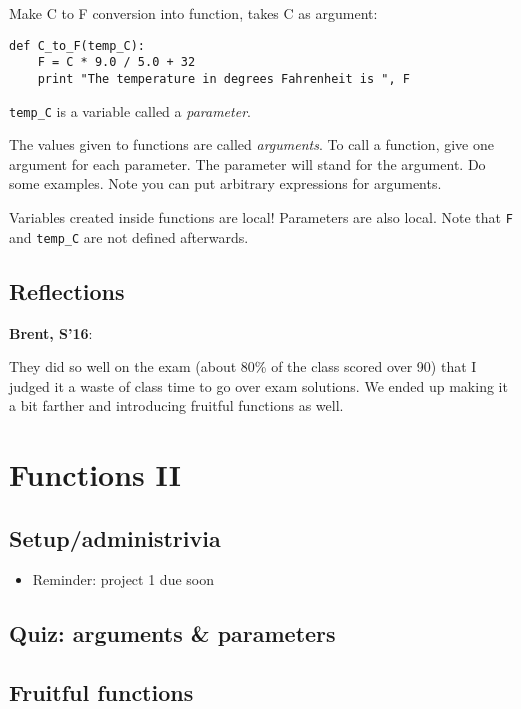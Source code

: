 \documentclass{article}
\newenvironment{reflect}[1]
{
  \begin{lrbox}{\reflectbox}
    \begin{minipage}[t]{\textwidth}
      \textbf{#1}:
}{
    \end{minipage}
  \end{lrbox}
  \fbox{\usebox{\reflectbox}}
}
\begin{document}
Make C to F conversion into function, takes C as argument:
\begin{verbatim}
def C_to_F(temp_C):
    F = C * 9.0 / 5.0 + 32
    print "The temperature in degrees Fahrenheit is ", F
\end{verbatim}

\verb|temp_C| is a variable called a \emph{parameter}.

The values given to functions are called \emph{arguments}.  To call a
function, give one argument for each parameter.  The parameter will
stand for the argument.  Do some examples.  Note you can put arbitrary
expressions for arguments.

Variables created inside functions are local!  Parameters are also
local. Note that \verb|F| and \verb|temp_C| are not defined afterwards.

\subsection*{Reflections}

\begin{reflect}{Brent, S'16}
  They did so well on the exam (about 80\% of the class scored over
  90) that I judged it a waste of class time to go over exam
  solutions.  We ended up making it a bit farther and introducing
  fruitful functions as well.
\end{reflect}

\newpage
\section{Functions II}

\subsection*{Setup/administrivia}
\begin{itemize}
\item Reminder: project 1 due soon
\end{itemize}

\subsection*{Quiz: arguments \& parameters}

\subsection*{Fruitful functions}
\end{document}
